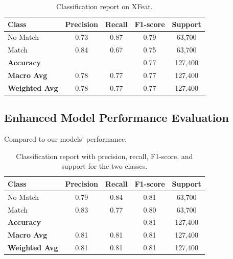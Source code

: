 \begin{table}[H]
    \centering
    \renewcommand{\arraystretch}{1.2}
    \begin{tabular}{lcccc}
        \toprule
        \textbf{Class}        & \textbf{Precision} & \textbf{Recall} & \textbf{F1-score} & \textbf{Support} \\
        \midrule
        No Match              & 0.73               & 0.87            & 0.79              & 63,700           \\
        Match                 & 0.84               & 0.67            & 0.75              & 63,700           \\
        \midrule
        \textbf{Accuracy}     &                    &                 & 0.77              & 127,400          \\
        \textbf{Macro Avg}    & 0.78               & 0.77            & 0.77              & 127,400          \\
        \textbf{Weighted Avg} & 0.78               & 0.77            & 0.77              & 127,400          \\
        \bottomrule
    \end{tabular}
    \caption{Classification report on XFeat.}
    \label{tab:classification_report}
\end{table}

\subsection{Enhanced Model Performance Evaluation}

Compared to our models' performance:

\begin{table}[H]
    \centering
    \renewcommand{\arraystretch}{1.2}
    \begin{tabular}{lcccc}
        \toprule
        \textbf{Class}        & \textbf{Precision} & \textbf{Recall} & \textbf{F1-score} & \textbf{Support} \\
        \midrule
        No Match              & 0.79               & 0.84            & 0.81              & 63,700           \\
        Match                 & 0.83               & 0.77            & 0.80              & 63,700           \\
        \midrule
        \textbf{Accuracy}     &                    &                 & 0.81              & 127,400          \\
        \textbf{Macro Avg}    & 0.81               & 0.81            & 0.81              & 127,400          \\
        \textbf{Weighted Avg} & 0.81               & 0.81            & 0.81              & 127,400          \\
        \bottomrule
    \end{tabular}
    \caption{Classification report with precision, recall, F1-score, and support for the two classes.}
    \label{tab:classification_report2}
\end{table}

